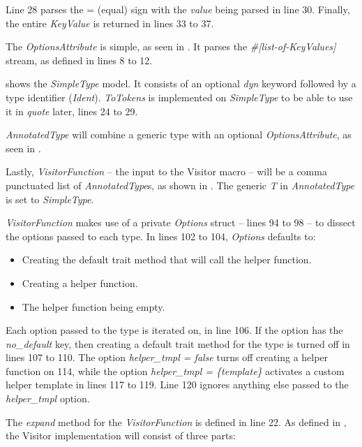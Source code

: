Line 28 parses the = (equal) sign with the \textit{value} being parsed in line 30.
Finally, the entire \textit{KeyValue} is returned in lines 33 to 37.

The \textit{OptionsAttribute} is simple, as seen in .
It parses the \textit{\#[list-of-KeyValues]} stream, as defined in lines 8 to 12.

 shows the \textit{SimpleType} model.
It consists of an optional \textit{dyn} keyword followed by a type identifier (\textit{Ident}).
\textit{ToTokens} is implemented on \textit{SimpleType} to be able to use it in \textit{quote} later, lines 24 to 29.

\textit{AnnotatedType} will combine a generic type with an optional \textit{OptionsAttribute}, as seen in .


Lastly, \textit{VisitorFunction} -- the input to the Visitor macro -- will be a comma punctuated list of \textit{AnnotatedType}s, as shown in .
The generic \textit{T} in \textit{AnnotatedType} is set to \textit{SimpleType}.

\textit{VisitorFunction} makes use of a private \textit{Options} struct -- lines 94 to 98 -- to dissect the options passed to each type.
In lines 102 to 104, \textit{Options} defaults to:

\begin{itemize}
	\item Creating the default trait method that will call the helper function.
	\item Creating a helper function.
	\item The helper function being empty.
\end{itemize}

Each option passed to the type is iterated on, in line 106.
If the option has the \textit{no\_default} key, then creating a default trait method for the type is turned off in lines 107 to 110.
The option \textit{helper\_tmpl = false} turns off creating a helper function on 114, while the option \textit{helper\_tmpl = \{template\}} activates a custom helper template in lines 117 to 119.
Line 120 ignores anything else passed to the \textit{helper\_tmpl} option.

The \textit{expand} method for the \textit{VisitorFunction} is defined in line 22.
As defined in , the Visitor implementation will consist of three parts:

